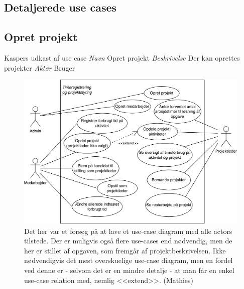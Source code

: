 \subsection{Detaljerede use cases}
\subsection{Opret projekt}
\Large{Kaspers udkast af use case}\newline
\normalsize
\emph{Navn}\newline
Opret projekt\newline
\emph{Beskrivelse}\newline
Der kan oprettes projekter\newline
\emph{Aktør}\newline
Bruger
\begin{figure}[H]
    \centering
    \caption{Det her var et forsøg på at lave et use-case diagram med alle actors tilstede. Der er muligvis også flere use-cases end nødvendig, men de her er stillet af opgaven, som fremgår af projektbeskrivelsen. Ikke nødvendigvis det mest overskuelige use-case diagram, men en fordel ved denne er - selvom det er en mindre detalje - at man får en enkel use-case relation med, nemlig <<extend>>. (Mathies)}\label{fig:AlleActorsPaaEnGang}
    \includegraphics[width=.7\textwidth]{Diagrams/Timeregistrering og projektstyring.png}
\end{figure}


    
